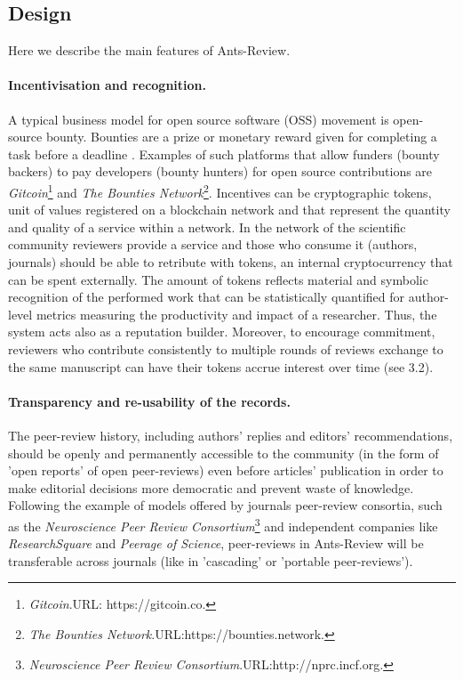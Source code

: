 \documentclass[runningheads]{llncs}
\begin{document}
\subsection{Design}

Here we describe the main features of Ants-Review.
\paragraph{Incentivisation and recognition.} A typical business model for open source software (OSS) movement is open-source bounty. Bounties are a prize or monetary reward given for completing a task before a deadline \cite{BountyGit}. Examples of such platforms that allow funders (bounty backers) to pay developers (bounty hunters) for open source contributions are \emph{Gitcoin}\footnote[3]{\emph{Gitcoin}.\textsc{URL:} https://gitcoin.co.} and \emph{The Bounties Network}\footnote[4]{\emph{The Bounties Network}.\textsc{URL:}https://bounties.network.}. Incentives can be cryptographic tokens, unit of values registered on a blockchain network and that represent the quantity and quality of a service within a network.
\newline In the network of the scientific community reviewers provide a service and those who consume it (authors, journals)  should be able to retribute with tokens, an internal cryptocurrency that can be spent externally. The amount of tokens reflects material and symbolic recognition of the performed work that can be statistically quantified for author-level metrics measuring the productivity and impact of a researcher.
Thus, the system acts also as a reputation builder.
\newline Moreover, to encourage commitment, reviewers who contribute consistently to multiple rounds of reviews exchange to the same manuscript can have their tokens accrue interest over time (see 3.2).

\paragraph{Transparency and re-usability of the records.} The peer-review history, including authors' replies and editors' recommendations, should be openly and permanently accessible to the community (in the form of 'open reports' of open peer-reviews) even before articles' publication in order to  make editorial decisions more democratic and prevent waste of knowledge. Following the example of models offered by journals peer-review consortia, such as the \emph{Neuroscience Peer Review Consortium}\footnote[5]{\emph{Neuroscience Peer Review Consortium}.\textsc{URL:}http://nprc.incf.org.} and independent companies like \emph{ResearchSquare}  and \emph{Peerage of Science}, peer-reviews in Ants-Review will be transferable across journals (like in 'cascading' or 'portable peer-reviews').
\end{document}
